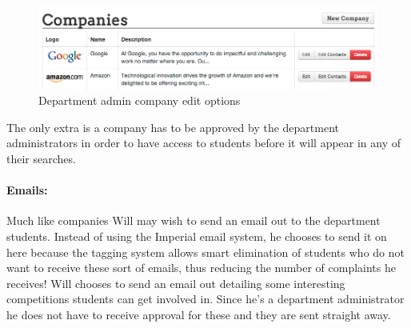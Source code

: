     \begin{figure}[H]\centering
    \includegraphics[scale=0.5]{images/user_experiences/admin/admin_company_edit_options}
    \caption{Department admin company edit options}
    \end{figure}

    The only extra is a company has to be approved by the department administrators in order to have access to students before it will appear in any of their searches.

  \paragraph{Emails:}
    Much like companies Will may wish to send an email out to the department students. Instead of using the Imperial email system, he chooses to send it on here because the tagging system allows smart elimination of students who do not want to receive these sort of emails, thus reducing the number of complaints he receives! Will chooses to send an email out detailing some interesting competitions students can get involved in. Since he's a department administrator he does not have to receive approval for these and they are sent straight away.
